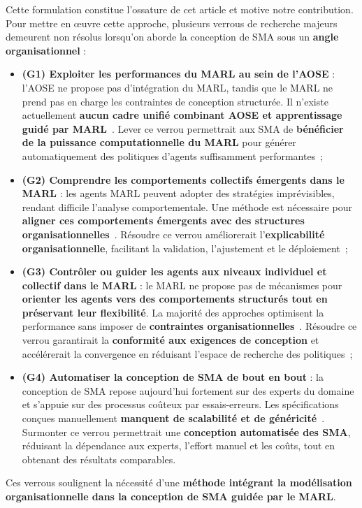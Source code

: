 Cette formulation constitue l'ossature de cet article et motive notre contribution.
%
Pour mettre en œuvre cette approche, plusieurs verrous de recherche majeurs demeurent non résolus lorsqu'on aborde la conception de SMA sous un \textbf{angle organisationnel} :
%
\begin{itemize}
    \item \textbf{(G1) Exploiter les performances du MARL au sein de l'AOSE} : l'AOSE ne propose pas d'intégration du MARL, tandis que le MARL ne prend pas en charge les contraintes de conception structurée. Il n'existe actuellement \textbf{aucun cadre unifié combinant AOSE et apprentissage guidé par MARL}~\cite{Cossentino2014}. Lever ce verrou permettrait aux SMA de \textbf{bénéficier de la puissance computationnelle du MARL} pour générer automatiquement des politiques d'agents suffisamment performantes~;

    \item \textbf{(G2) Comprendre les comportements collectifs émergents dans le MARL} : les agents MARL peuvent adopter des stratégies imprévisibles, rendant difficile l'analyse comportementale. Une méthode est nécessaire pour \textbf{aligner ces comportements émergents avec des structures organisationnelles}~\cite{Du2022, Papoudakis2021}. Résoudre ce verrou améliorerait l'\textbf{explicabilité organisationnelle}, facilitant la validation, l'ajustement et le déploiement~;

    \item \textbf{(G3) Contrôler ou guider les agents aux niveaux individuel et collectif dans le MARL} : le MARL ne propose pas de mécanismes pour \textbf{orienter les agents vers des comportements structurés tout en préservant leur flexibilité}. La majorité des approches optimisent la performance sans imposer de \textbf{contraintes organisationnelles}~\cite{Oroojlooy2023}. Résoudre ce verrou garantirait la \textbf{conformité aux exigences de conception} et accélérerait la convergence en réduisant l'espace de recherche des politiques~;

    \item \textbf{(G4) Automatiser la conception de SMA de bout en bout} : la conception de SMA repose aujourd'hui fortement sur des experts du domaine et s'appuie sur des processus coûteux par essais-erreurs. Les spécifications conçues manuellement \textbf{manquent de scalabilité et de généricité}~\cite{Nguyen2020}. Surmonter ce verrou permettrait une \textbf{conception automatisée des SMA}, réduisant la dépendance aux experts, l'effort manuel et les coûts, tout en obtenant des résultats comparables.
\end{itemize}
%
Ces verrous soulignent la nécessité d'une \textbf{méthode intégrant la modélisation organisationnelle dans la conception de SMA guidée par le MARL}.

